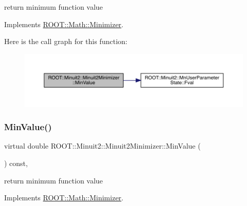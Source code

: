 return minimum function value 



Implements \mbox{\hyperlink{classROOT_1_1Math_1_1Minimizer_ae4845ff42bc0e244fdfa068c53b9a965}{R\+O\+O\+T\+::\+Math\+::\+Minimizer}}.

Here is the call graph for this function\+:
\nopagebreak
\begin{figure}[H]
\begin{center}
\leavevmode
\includegraphics[width=350pt]{d0/d9c/classROOT_1_1Minuit2_1_1Minuit2Minimizer_a4a1c7fc174527aefab3d8c87bf8c0672_cgraph}
\end{center}
\end{figure}
\mbox{\label{classROOT_1_1Minuit2_1_1Minuit2Minimizer_a4a1c7fc174527aefab3d8c87bf8c0672}} 
\subsubsection{\texorpdfstring{MinValue()}{MinValue()}\hspace{0.1cm}{\footnotesize\ttfamily [3/3]}}
{\footnotesize\ttfamily virtual double R\+O\+O\+T\+::\+Minuit2\+::\+Minuit2\+Minimizer\+::\+Min\+Value (\begin{DoxyParamCaption}{ }\end{DoxyParamCaption}) const\hspace{0.3cm}{\ttfamily [inline]}, {\ttfamily [virtual]}}



return minimum function value 



Implements \mbox{\hyperlink{classROOT_1_1Math_1_1Minimizer_ae4845ff42bc0e244fdfa068c53b9a965}{R\+O\+O\+T\+::\+Math\+::\+Minimizer}}.

